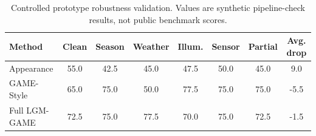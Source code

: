 \begin{table}[t]
\centering
\caption{Controlled prototype robustness validation. Values are synthetic pipeline-check results, not public benchmark scores.}
\label{tab:controlled_robustness}
\begin{tabular}{lccccccc}
\toprule
Method & Clean & Season & Weather & Illum. & Sensor & Partial & Avg. drop \\
\midrule
Appearance & 55.0 & 42.5 & 45.0 & 47.5 & 50.0 & 45.0 & 9.0 \\
GAME-Style & 65.0 & 75.0 & 50.0 & 77.5 & 75.0 & 75.0 & -5.5 \\
Full LGM-GAME & 72.5 & 75.0 & 77.5 & 70.0 & 75.0 & 72.5 & -1.5 \\
\bottomrule
\end{tabular}
\end{table}
